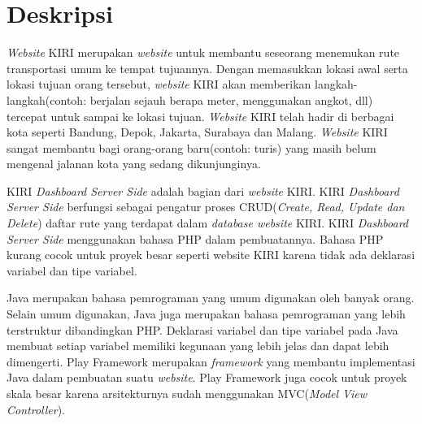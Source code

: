 \documentclass[a4paper,twoside]{article}
\begin{document}
\title{\@judultopik}
\author{\nama \textendash \@npm} 

\newcommand{\nama}{Tommy Adhitya The}
\newcommand{\@npm}{2012730031}
\newcommand{\@judultopik}{\textit{Porting} PHP menjadi Java dan Play Framework. Studi Kasus: KIRI \textit{Dashboard Server Side}} %
\newcommand{\jumpemb}{1} %
\newcommand{\tanggal}{27/08/2015}
\maketitle


\section{Deskripsi}
\textit{Website} KIRI merupakan \textit{website} untuk membantu seseorang menemukan rute transportasi umum ke tempat tujuannya. Dengan memasukkan lokasi awal serta lokasi tujuan orang tersebut, \textit{website} KIRI akan memberikan langkah-langkah(contoh: berjalan sejauh berapa meter, menggunakan angkot, dll) tercepat untuk sampai ke lokasi tujuan. \textit{Website} KIRI telah hadir di berbagai kota seperti Bandung, Depok, Jakarta, Surabaya dan Malang. \textit{Website} KIRI sangat membantu bagi orang-orang baru(contoh: turis) yang masih belum mengenal jalanan kota yang sedang dikunjunginya.

KIRI \textit{Dashboard Server Side} adalah bagian dari \textit{website} KIRI. KIRI \textit{Dashboard Server Side} berfungsi sebagai pengatur proses CRUD(\textit{Create, Read, Update dan Delete}) daftar rute yang terdapat dalam \textit{database website} KIRI. KIRI \textit{Dashboard Server Side} menggunakan bahasa PHP dalam pembuatannya. Bahasa PHP kurang cocok untuk proyek besar seperti website KIRI karena tidak ada deklarasi variabel dan tipe variabel.

Java merupakan bahasa pemrograman yang umum digunakan oleh banyak orang. Selain umum digunakan, Java juga merupakan bahasa pemrograman yang lebih terstruktur dibandingkan PHP. Deklarasi variabel dan tipe variabel pada Java membuat setiap variabel memiliki kegunaan yang lebih jelas dan dapat lebih dimengerti. Play Framework merupakan \textit{framework} yang membantu implementasi Java dalam pembuatan suatu \textit{website}. Play Framework juga cocok untuk proyek skala besar karena arsitekturnya sudah menggunakan MVC(\textit{Model View Controller}).
\end{document}
